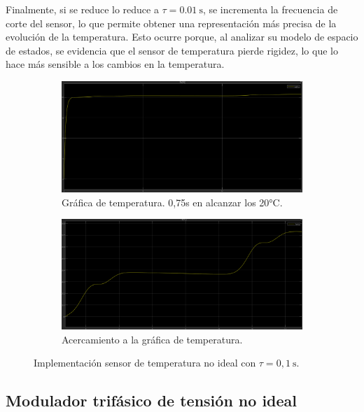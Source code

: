 \documentclass{article}
\begin{document}
Finalmente, si se reduce lo reduce a $\tau = 0.01 \ \text{s}$, se incrementa la frecuencia de corte del sensor, lo que permite obtener una representación más precisa de la evolución de la temperatura. Esto ocurre porque, al analizar su modelo de espacio de estados, se evidencia que el sensor de temperatura pierde rigidez, lo que lo hace más sensible a los cambios en la temperatura.

\begin{figure}[H]
    \centering
    \begin{subfigure}[t]{0.45\textwidth}
        \centering
        \includegraphics[width=\textwidth]{Imagenes/13_tempNI_01.png}
        \caption{Gráfica de temperatura. 0,75s en alcanzar los 20°C.}
    \end{subfigure}
    \begin{subfigure}[t]{0.45\textwidth}
        \centering
        \includegraphics[width=\textwidth]{Imagenes/14_tmpNI_01_acercamiento.png}
        \caption{Acercamiento a la gráfica de temperatura.}
    \end{subfigure}
    \caption{Implementación sensor de temperatura no ideal con $\tau = 0,1 \ \text{s}$.}
\end{figure}

\subsection{Modulador trif\'asico de tensi\'on no ideal}
\end{document}
